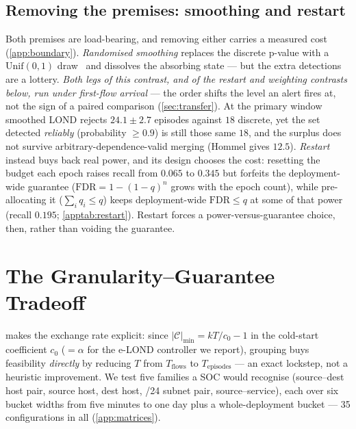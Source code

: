 \documentclass[conference]{IEEEtran}
\newcommand{\Cal}{\mathcal{C}}
\newcommand{\nCal}{\lvert\Cal\rvert}
\newcommand{\FDR}{\mathrm{FDR}}
\begin{document}
\subsection{Removing the premises: smoothing and restart}\label{sec:smoothing}\label{sec:restart}

Both premises are load-bearing, and removing either carries a measured cost (\cref{app:boundary}).
\emph{Randomised smoothing} replaces the discrete p-value with a $\mathrm{Unif}(0,1)$
draw~\cite{vovk2005alrw,hennhofer2026resolution} and dissolves the absorbing state --- but the extra
detections are a lottery. \emph{Both legs of this contrast, and of the restart and weighting contrasts
below, run under first-flow arrival} --- the order shifts the level an alert fires at, not the sign of a
paired comparison (\cref{sec:transfer}). At the primary window smoothed LOND rejects $24.1{\pm}2.7$
episodes against $18$ discrete, yet the set detected \emph{reliably} (probability $\ge0.9$) is still
those same $18$, and the surplus does not survive arbitrary-dependence-valid merging (Hommel gives
$12.5$). \emph{Restart} instead buys back real power, and its design chooses the cost: resetting the
budget each epoch raises recall from $0.065$ to $0.345$ but forfeits the deployment-wide guarantee ($\FDR = 1-(1-q)^n$ grows with
the epoch count), while pre-allocating it ($\sum_i q_i\le q$) keeps deployment-wide $\FDR\le q$ at some
of that power (recall $0.195$; \cref{apptab:restart}). Restart forces a power-versus-guarantee choice,
then, rather than voiding the guarantee.

\section{The Granularity--Guarantee Tradeoff}\label{sec:granularity}

 makes the exchange rate explicit: since $\nCal_{\min} = kT/c_0 - 1$ in the
cold-start coefficient $c_0$ ($=\alpha$ for the e-LOND controller we report), grouping buys
feasibility \emph{directly} by reducing $T$ from $T_{\text{flows}}$ to
$T_{\text{episodes}}$ --- an exact lockstep, not a heuristic improvement. We
test five families a SOC would recognise (source--dest host pair, source host, dest host, /24 subnet
pair, source--service), each over six bucket widths from five minutes to one day plus a whole-deployment
bucket --- 35 configurations in all (\cref{app:matrices}).
\end{document}
